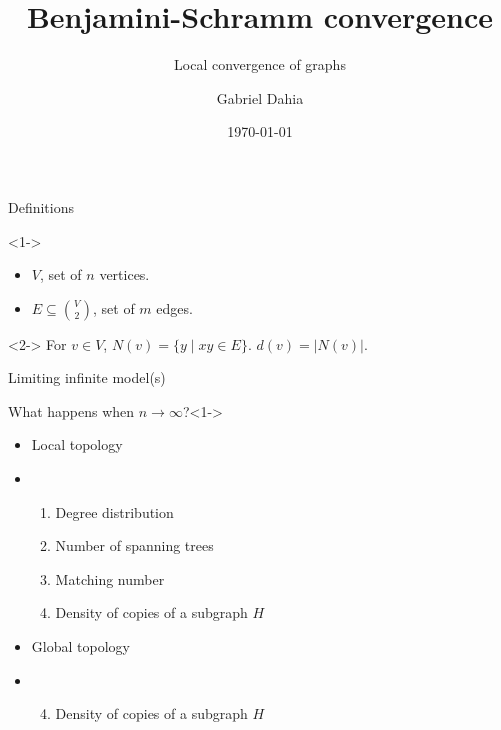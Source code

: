 \documentclass{beamer}
\title{Benjamini-Schramm convergence}
\subtitle{Local convergence of graphs}
\author{Gabriel Dahia}
\institute{IMPA}
\date{\today}
\begin{document}
\beamertemplatenavigationsymbolsempty

\begin{frame}
  \titlepage
\end{frame}

\begin{frame}{Definitions}
  \begin{definition}[Graph, G]<1->
    \begin{itemize}
      \item $V$, set of $n$ vertices.
      \item $E \subseteq {V \choose 2}$, set of $m$ edges.
    \end{itemize}
  \end{definition}

  \begin{definition}<2->
    For $v \in V$, \(N(v) = \{y \mid xy \in E\}\). $d(v) = |N(v)|$.
  \end{definition}

\end{frame}

\begin{frame}{Limiting infinite model(s)}
  \begin{block}{What happens when $n \to \infty$?}<1->
    \begin{itemize}
      \item<6-> Local topology

      \item[]
            \begin{enumerate}
              \item<2-> Degree distribution
              \item<3-> Number of spanning trees
              \item<4-> Matching number
              \item<5> Density of copies of a subgraph $H$
            \end{enumerate}

      \item<7-> Global topology
      \item[]
            \begin{enumerate}
              \setcounter{enumi}{3}
              \item<7-> Density of copies of a subgraph $H$
            \end{enumerate}
    \end{itemize}
  \end{block}
\end{frame}
\end{document}
